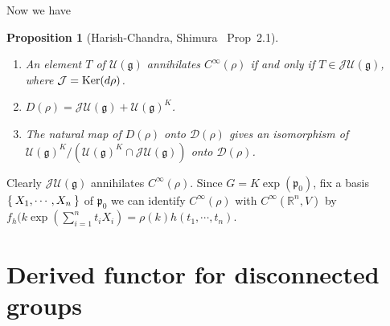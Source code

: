 \documentclass[12pt]{article}
\newtheorem{prop}{Proposition}
\def\Ker{{\rm Ker}}
\def\bR{{\mathbb{R}}}
\def\fpp{\mathfrak{p}}
\def\fgg{\mathfrak{g}}
\def\cdd{\mathcal{D}}
\def\cjj{\mathcal{J}}
\def\cuu{\mathcal{U}}
\def\cug{\cuu(\fgg)}
\begin{document}
Now we have
\begin{prop}[Harish-Chandra, Shimura~\cite{Shimura1990} Prop~2.1]
\begin{enumerate}[(1)] 
\item An element $T$ of $\cuu(\fgg)$ annihilates 
$C^{\infty}(\rho)$ if and only if $T \in \cjj\cuu(\fgg)$, where
$\cjj = \Ker(d\rho)$.
\item $D(\rho) = \cjj\cug + \cug^K$.
\item The natural map of $D(\rho)$ onto $\cdd(\rho)$ gives an 
isomorphism of $\cug^K/(\cug^K\cap \cjj\cug)$ onto $\cdd(\rho)$. 
\end{enumerate}
\end{prop}
\proof
\begin{enumerate}[(1)]
Clearly $\cjj\cug$ annihilates $C^\infty(\rho)$.
Since $G = K \exp(\fpp_0)$, 
fix a basis $\Set{X_1, \cdots, X_n}$ of $\fpp_0$
we can identify $C^\infty(\rho)$ 
with $C^\infty(\bR^n,V)$ by 
$f_h(k\exp(\sum_{i=1}^n t_i X_i) = \rho(k)h(t_1,\cdots, t_n)$.


\end{enumerate}


\section{Derived functor for disconnected groups}



{}

\end{document}
